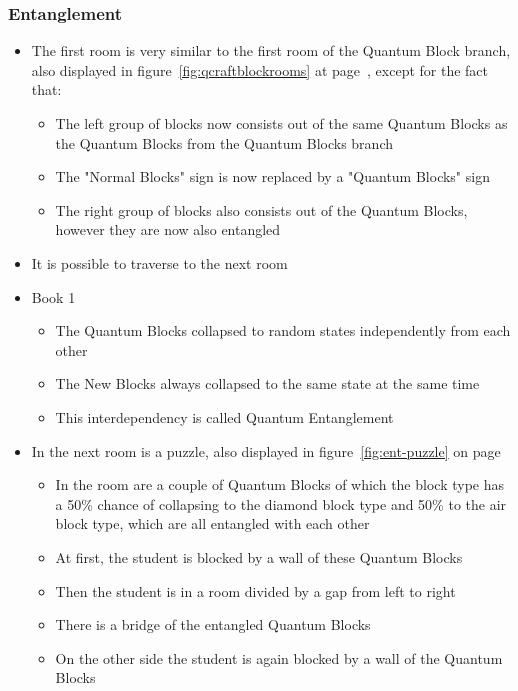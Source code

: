 \documentclass[11pt,twoside]{report} %
\begin{document}
\subsubsection{Entanglement}

\begin{itemize}
	\item The first room is very similar to the first room of the Quantum Block branch, also displayed in figure~\ref{fig:qcraftblockrooms} at page~\pageref{fig:qcraftblockrooms}, except for the fact that:
	\begin{itemize}
		\item The left group of blocks now consists out of the same Quantum Blocks as the Quantum Blocks from the Quantum Blocks branch
		\item The "Normal Blocks" sign is now replaced by a "Quantum Blocks" sign
		\item The right group of blocks also consists out of the Quantum Blocks, however they are now also entangled
	\end{itemize}
	\item It is possible to traverse to the next room
	\item Book 1
	\begin{itemize}
		\item The Quantum Blocks collapsed to random states independently from each other
		\item The New Blocks always collapsed to the same state at the same time
		\item This interdependency is called Quantum Entanglement
	\end{itemize}
	\item In the next room is a puzzle, also displayed in figure~\ref{fig:ent-puzzle} on page~\pageref{fig:ent-puzzle}
	\begin{itemize}
		\item In the room are a couple of Quantum Blocks of which the block type has a 50\% chance of collapsing to the diamond block type and 50\% to the air block type, which are all entangled with each other
		\item At first, the student is blocked by a wall of these Quantum Blocks
		\item Then the student is in a room divided by a gap from left to right
		\item There is a bridge of the entangled Quantum Blocks
		\item On the other side the student is again blocked by a wall of the Quantum Blocks
	\end{itemize}

\end{itemize}
\end{document}
